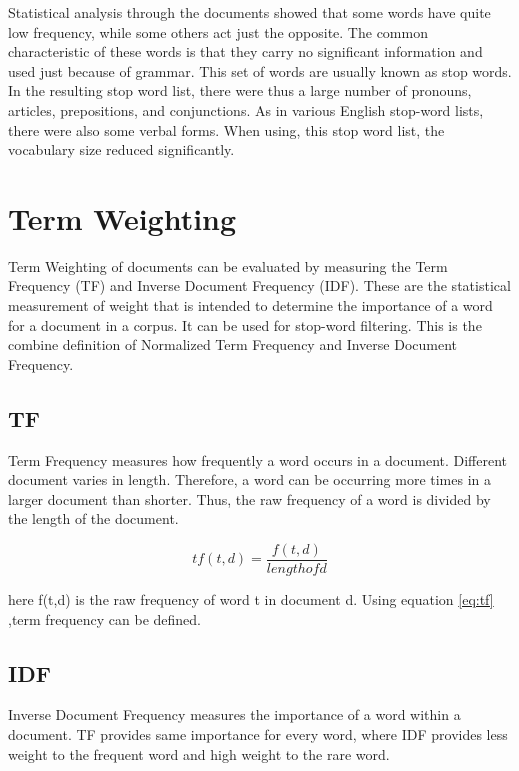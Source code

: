 Statistical analysis through the documents showed that some words have quite low frequency, while some others act just the opposite. The common characteristic of these words is that they carry no significant information and used just because of grammar. This set of words are usually known as stop words.  In the resulting stop word list, there were thus a large number of pronouns, articles, prepositions, and conjunctions. As in various English stop-word lists, there
were also some verbal forms. When using, this stop word list, the vocabulary size reduced significantly.


\section{Term Weighting}

Term Weighting of documents can be evaluated by measuring the Term Frequency (TF) and Inverse Document Frequency (IDF). These are the statistical measurement of weight that is
intended to determine the importance of a word for a document in a corpus. It can be used for stop-word filtering. This is the combine definition of Normalized Term Frequency and Inverse Document Frequency.


\subsection{TF}

Term Frequency measures how frequently a word occurs in a document. Different document varies in length. Therefore, a word can be occurring more times in a larger document than shorter. Thus, the raw frequency of a word is divided by the length of the document.

\begin{equation}
tf(t,d) = \frac{f(t,d)}{length of d}
\label{eq:tf}
\end{equation}



here f(t,d) is the raw frequency of word t in document d. Using equation \ref{eq:tf} ,term frequency can be defined.

\subsection{IDF}

Inverse Document Frequency measures the importance of a word within a document. TF provides same importance for every word, where IDF provides less weight to the frequent word and high weight to the rare word.

